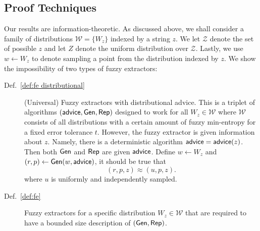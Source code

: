 

\subsection{Proof Techniques}
Our results are information-theoretic. As discussed above, we shall
consider a family of distributions $\mathcal{W} = \{ W_z \}$ indexed by a string $z$.  We let $\mathcal{Z}$ denote the set of possible $z$ and let $Z$
denote the uniform distribution over $\mathcal{Z}$.   
Lastly, we use $w\leftarrow W_z$ to
denote sampling a point from the distribution indexed by $z$.  We show the
impossibility of two types of fuzzy extractors:
\begin{description}
\item[Def.~\ref{def:fe distributional}] (Universal) Fuzzy extractors with distributional advice.  This is a triplet of algorithms $({\mathsf{advice}}, {\mathsf{Gen}}, {\mathsf{Rep}})$ designed to work for all $W_z \in \mathcal{W}$ where $\mathcal{W}$ consists of all distributions with a certain amount of fuzzy min-entropy for a fixed error tolerance $t$.  However, the fuzzy extractor is given information about $z$.  Namely, there is a deterministic algorithm ${\mathsf{advice}} = {\mathsf{advice}}(z)$. Then both ${\mathsf{Gen}}$ and ${\mathsf{Rep}}$ are given ${\mathsf{advice}}$. Define $w\leftarrow W_z$ and $(r, p) \leftarrow {\ensuremath{\mathsf{Gen}}}(w, {\mathsf{advice}})$, it should be true that 
\[
(r, p, z) \approx (u, p, z).
\] 
where $u$ is uniformly and independently sampled.  
\item[Def.~\ref{def:fe}] Fuzzy extractors for a specific distribution $W_z \in \mathcal{W}$ that are required to have a bounded size description of $({\mathsf{Gen}}, {\mathsf{Rep}})$.
\end{description}

